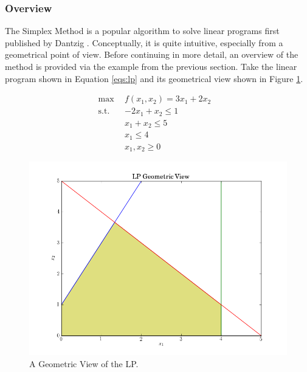 \subsubsection{Overview}
The Simplex Method is a popular algorithm to solve linear programs first
published by Dantzig \cite{dantzig_maximization_1951}. Conceptually, it is quite
intuitive, especially from a geometrical point of view. Before continuing in
more detail, an overview of the method is provided via the example from the
previous section. Take the linear program shown in Equation \ref{eqs:lp} and its
geometrical view shown in Figure \ref{fig:geometric}.

\begin{subequations}\label{eqs:lp}
  \begin{align}
    \max \:\: & 
    f(x_1, x_2) = 3 x_1 + 2 x_2
    & \label{eqs:lp_obj} \\
    \text{s.t.} \:\: &
    -2 x_1 + x_2 \leq 1 \\
    &
    x_1 + x_2 \leq 5 
    & \label{eqs:lp_sup} \\
    &
    x_1 \leq 4
    &\label{eqs:lp_x1} \\
    &
    x_1, x_2 \geq 0
    &\label{eqs:lp_x2}
  \end{align}
\end{subequations}

\begin{figure}[H]
  \begin{center}
    \includegraphics[width=\linewidth]{./chapters/litreview/plots/geometric.png}
  \caption{A Geometric View of the LP.}
  \label{fig:geometric}
  \end{center}
\end{figure}

